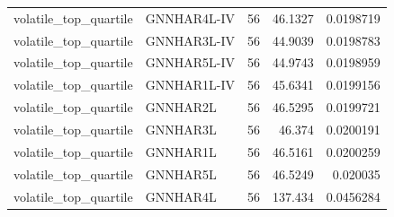 \begin{tabular}{llrrr}
volatile_top_quartile & GNNHAR4L-IV & 56 & 46.1327 & 0.0198719 \\
volatile_top_quartile & GNNHAR3L-IV & 56 & 44.9039 & 0.0198783 \\
volatile_top_quartile & GNNHAR5L-IV & 56 & 44.9743 & 0.0198959 \\
volatile_top_quartile & GNNHAR1L-IV & 56 & 45.6341 & 0.0199156 \\
volatile_top_quartile & GNNHAR2L & 56 & 46.5295 & 0.0199721 \\
volatile_top_quartile & GNNHAR3L & 56 & 46.374 & 0.0200191 \\
volatile_top_quartile & GNNHAR1L & 56 & 46.5161 & 0.0200259 \\
volatile_top_quartile & GNNHAR5L & 56 & 46.5249 & 0.020035 \\
volatile_top_quartile & GNNHAR4L & 56 & 137.434 & 0.0456284 \\
\bottomrule
\end{tabular}
